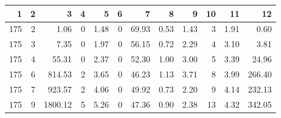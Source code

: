 \begin{tabular}{rrrrrrrrrrrr}
\toprule
1 & 2 & 3 & 4 & 5 & 6 & 7 & 8 & 9 & 10 & 11 & 12 \\
\midrule
175 & 2 & 1.06 & 0 & 1.48 & 0 & 69.93 & 0.53 & 1.43 & 3 & 1.91 & 0.60 \\
175 & 3 & 7.35 & 0 & 1.97 & 0 & 56.15 & 0.72 & 2.29 & 4 & 3.10 & 3.81 \\
175 & 4 & 55.31 & 0 & 2.37 & 0 & 52.30 & 1.00 & 3.00 & 5 & 3.39 & 24.96 \\
175 & 6 & 814.53 & 2 & 3.65 & 0 & 46.23 & 1.13 & 3.71 & 8 & 3.99 & 266.40 \\
175 & 7 & 923.57 & 2 & 4.06 & 0 & 49.92 & 0.73 & 2.20 & 9 & 4.14 & 232.13 \\
175 & 9 & 1800.12 & 5 & 5.26 & 0 & 47.36 & 0.90 & 2.38 & 13 & 4.32 & 342.05 \\
\bottomrule
\end{tabular}
